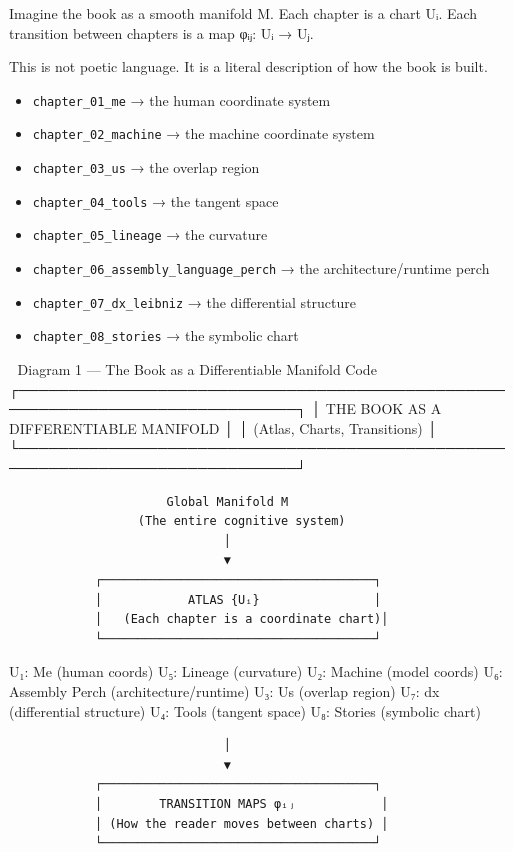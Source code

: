\documentclass[
]{article}
\providecommand{\tightlist}{%
  \setlength{\itemsep}{0pt}\setlength{\parskip}{0pt}}
\begin{document}
Imagine the book as a smooth manifold M. Each chapter is a chart Uᵢ.
Each transition between chapters is a map φᵢⱼ: Uᵢ → Uⱼ.

This is not poetic language. It is a literal description of how the book
is built.

\begin{itemize}
\tightlist
\item
  \texttt{chapter\_01\_me} → the human coordinate system
\item
  \texttt{chapter\_02\_machine} → the machine coordinate system
\item
  \texttt{chapter\_03\_us} → the overlap region
\item
  \texttt{chapter\_04\_tools} → the tangent space
\item
  \texttt{chapter\_05\_lineage} → the curvature
\item
  \texttt{chapter\_06\_assembly\_language\_perch} → the
  architecture/runtime perch
\item
  \texttt{chapter\_07\_dx\_leibniz} → the differential structure
\item
  \texttt{chapter\_08\_stories} → the symbolic chart
\end{itemize}

📐 Diagram 1 --- The Book as a Differentiable Manifold Code
┌──────────────────────────────────────────────────────────────────────────────┐
│ THE BOOK AS A DIFFERENTIABLE MANIFOLD │ │ (Atlas, Charts, Transitions)
│
└──────────────────────────────────────────────────────────────────────────────┘

\begin{verbatim}
                      Global Manifold M
                  (The entire cognitive system)
                              │
                              ▼
            ┌──────────────────────────────────────┐
            │            ATLAS {Uᵢ}                │
            │   (Each chapter is a coordinate chart)│
            └──────────────────────────────────────┘
\end{verbatim}

U₁: Me (human coords) U₅: Lineage (curvature) U₂: Machine (model coords)
U₆: Assembly Perch (architecture/runtime) U₃: Us (overlap region) U₇: dx
(differential structure) U₄: Tools (tangent space) U₈: Stories (symbolic
chart)

\begin{verbatim}
                              │
                              ▼
            ┌──────────────────────────────────────┐
            │        TRANSITION MAPS φᵢⱼ            │
            │ (How the reader moves between charts) │
            └──────────────────────────────────────┘
\end{verbatim}
\end{document}
